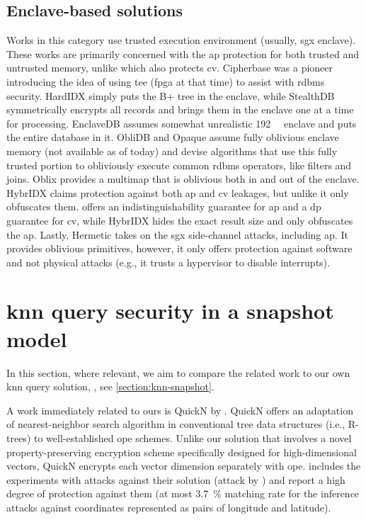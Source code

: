 		\subsection{Enclave-based solutions}

			Works in this category use trusted execution environment (usually, \acrshort{sgx} enclave).
			These works are primarily concerned with the \acrshort{ap} protection for both trusted and untrusted memory, unlike \epsolute{} which also protects \acrshort{cv}.
			Cipherbase \cite{cipherbase-daas} was a pioneer introducing the idea of using \acrshort{tee} (\acrshort{fpga} at that time) to assist with \acrshort{rdbms} security.
			HardIDX \cite{hardidx} simply puts the B+ tree in the enclave, while StealthDB \cite{stealth-db} symmetrically encrypts all records and brings them in the enclave one at a time for processing.
			EnclaveDB \cite{enclave-db} assumes somewhat unrealistic \SI{192}{\giga\byte} enclave and puts the entire database in it.
			ObliDB \cite{oblidb} and Opaque \cite{opaque} assume fully oblivious enclave memory (not available as of today) and devise algorithms that use this fully trusted portion to obliviously execute common \acrshort{rdbms} operators, like filters and joins.
			Oblix \cite{oblix} provides a multimap that is oblivious both in and out of the enclave.
			HybrIDX claims protection against both \acrshort{ap} and \acrshort{cv} leakages, but unlike \epsolute{} it only obfuscates them.
			\epsolute{} offers an indistinguishability guarantee for \acrshort{ap} and a \acrshort{dp} guarantee for \acrshort{cv}, while HybrIDX hides the exact result size and only obfuscates the \acrshort{ap}.
			Lastly, Hermetic \cite{hermetic} takes on the \acrshort{sgx} side-channel attacks, including \acrshort{ap}.
			It provides oblivious primitives, however, it only offers protection against software and not physical attacks (e.g., it trusts a hypervisor to disable interrupts).

	\section{\texorpdfstring{\acrshort{knn}}{kNN} query security in a snapshot model}

		In this section, where relevant, we aim to compare the related work to our own \acrshort{knn} query solution, \kanon{} \cite{k-anon}, see \cref{section:knn-snapshot}.

		A work immediately related to ours is QuickN by \textcite{quick-n}.
		QuickN offers an adaptation of nearest-neighbor search algorithm in conventional tree data structures (i.e., R-trees) to well-established \acrfull{ope} schemes.
		Unlike our solution that involves a novel property-preserving encryption scheme specifically designed for high-dimensional vectors, QuickN encrypts each vector dimension separately with \acrshort{ope}.
		\cite{quick-n} includes the experiments with attacks against their solution (attack by \textcite{leakage-abuse-grubs-2017}) and report a high degree of protection against them (at most \SI{3.7}{\percent} matching rate for the inference attacks against coordinates represented as pairs of longitude and latitude).

